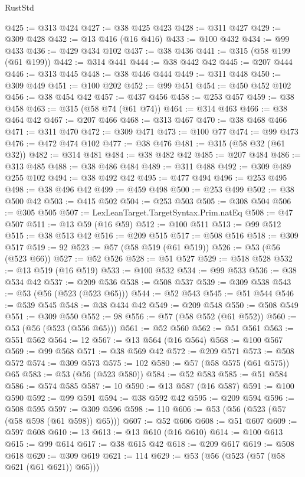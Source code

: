 \begin{lexlean}{RustStd}
\begin{coremodule}
{\begin{coremodule}
{{{{{{{{{{{{{{@425 := @313 @424
@427 := @38 @425 @423
@428 := @311 @427
@429 := @309 @428
@432 := @13 @416 (@16 @416)
@433 := @100 @432
@434 := @99 @433
@436 := @429 @434 @102
@437 := @38 @436
@441 := @315 (@58 @199 (@61 @199))
@442 := @314 @441
@444 := @38 @442 @42
@445 := @207 @444
@446 := @313 @445
@448 := @38 @446 @444
@449 := @311 @448
@450 := @309 @449
@451 := @100 @202
@452 := @99 @451
@454 := @450 @452 @102
@456 := @38 @454 @42
@457 := @437 @456
@458 := @253 @457
@459 := @38 @458
@463 := @315 (@58 @74 (@61 @74))
@464 := @314 @463
@466 := @38 @464 @42
@467 := @207 @466
@468 := @313 @467
@470 := @38 @468 @466
@471 := @311 @470
@472 := @309 @471
@473 := @100 @77
@474 := @99 @473
@476 := @472 @474 @102
@477 := @38 @476
@481 := @315 (@58 @32 (@61 @32))
@482 := @314 @481
@484 := @38 @482 @42
@485 := @207 @484
@486 := @313 @485
@488 := @38 @486 @484
@489 := @311 @488
@492 := @309 @489 @255 @102
@494 := @38 @492 @42
@495 := @477 @494
@496 := @253 @495
@498 := @38 @496 @42
@499 := @459 @498
@500 := @253 @499
@502 := @38 @500 @42
@503 := @415 @502
@504 := @253 @503
@505 := @308 @504
@506 := @305 @505
@507 := LexLeanTarget.TargetSyntax.Prim.natEq
@508 := @47 @507
@511 := @13 @59 (@16 @59)
@512 := @100 @511
@513 := @99 @512
@515 := @38 @513 @42
@516 := @209 @515
@517 := @508 @516
@518 := @309 @517
@519 := 92
@523 := @57 (@58 @519 (@61 @519))
@526 := @53 (@56 (@523 @66))
@527 := @52 @526
@528 := @51 @527
@529 := @518 @528
@532 := @13 @519 (@16 @519)
@533 := @100 @532
@534 := @99 @533
@536 := @38 @534 @42
@537 := @209 @536
@538 := @508 @537
@539 := @309 @538
@543 := @53 (@56 (@523 (@523 @65)))
@544 := @52 @543
@545 := @51 @544
@546 := @539 @545
@548 := @38 @434 @42
@549 := @209 @548
@550 := @508 @549
@551 := @309 @550
@552 := 98
@556 := @57 (@58 @552 (@61 @552))
@560 := @53 (@56 (@523 (@556 @65)))
@561 := @52 @560
@562 := @51 @561
@563 := @551 @562
@564 := 12
@567 := @13 @564 (@16 @564)
@568 := @100 @567
@569 := @99 @568
@571 := @38 @569 @42
@572 := @209 @571
@573 := @508 @572
@574 := @309 @573
@575 := 102
@580 := @57 (@58 @575 (@61 @575)) @65
@583 := @53 (@56 (@523 @580))
@584 := @52 @583
@585 := @51 @584
@586 := @574 @585
@587 := 10
@590 := @13 @587 (@16 @587)
@591 := @100 @590
@592 := @99 @591
@594 := @38 @592 @42
@595 := @209 @594
@596 := @508 @595
@597 := @309 @596
@598 := 110
@606 := @53 (@56 (@523 (@57 (@58 @598 (@61 @598)) @65)))
@607 := @52 @606
@608 := @51 @607
@609 := @597 @608
@610 := 13
@613 := @13 @610 (@16 @610)
@614 := @100 @613
@615 := @99 @614
@617 := @38 @615 @42
@618 := @209 @617
@619 := @508 @618
@620 := @309 @619
@621 := 114
@629 := @53 (@56 (@523 (@57 (@58 @621 (@61 @621)) @65)))
}}}}}}}}}}}}}}
\end{coremodule}}
\end{coremodule}
\end{lexlean}
